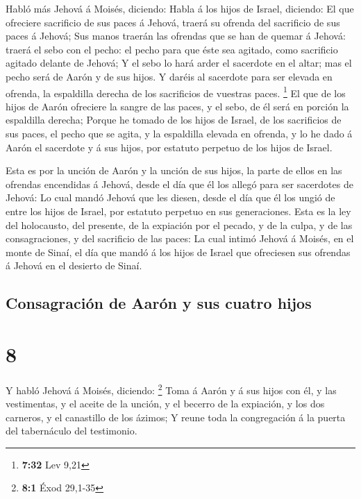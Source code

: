  Habló más Jehová á Moisés, diciendo: 
Habla á los hijos de Israel, diciendo: El que ofreciere sacrificio de
sus paces á Jehová, traerá su ofrenda del sacrificio de sus paces á
Jehová;  Sus manos traerán las ofrendas que se han de
quemar á Jehová: traerá el sebo con el pecho: el pecho para que éste sea
agitado, como sacrificio agitado delante de Jehová;  Y el
sebo lo hará arder el sacerdote en el altar; mas el pecho será de Aarón
y de sus hijos.  Y daréis al sacerdote para ser elevada
en ofrenda, la espaldilla derecha de los sacrificios de vuestras paces.
\footnote{\textbf{7:32} Lev 9,21}  El que de los hijos de
Aarón ofreciere la sangre de las paces, y el sebo, de él será en porción
la espaldilla derecha;  Porque he tomado de los hijos de
Israel, de los sacrificios de sus paces, el pecho que se agita, y la
espaldilla elevada en ofrenda, y lo he dado á Aarón el sacerdote y á sus
hijos, por estatuto perpetuo de los hijos de Israel.

 Esta es por la unción de Aarón y la unción de sus hijos,
la parte de ellos en las ofrendas encendidas á Jehová, desde el día que
él los allegó para ser sacerdotes de Jehová:  Lo cual
mandó Jehová que les diesen, desde el día que él los ungió de entre los
hijos de Israel, por estatuto perpetuo en sus generaciones.
 Esta es la ley del holocausto, del presente, de la
expiación por el pecado, y de la culpa, y de las consagraciones, y del
sacrificio de las paces:  La cual intimó Jehová á Moisés,
en el monte de Sinaí, el día que mandó á los hijos de Israel que
ofreciesen sus ofrendas á Jehová en el desierto de Sinaí.

\hypertarget{consagraciuxf3n-de-aaruxf3n-y-sus-cuatro-hijos}{%
\subsection{Consagración de Aarón y sus cuatro
hijos}\label{consagraciuxf3n-de-aaruxf3n-y-sus-cuatro-hijos}}

\hypertarget{section-7}{%
\section{8}\label{section-7}}

 Y habló Jehová á Moisés, diciendo: \footnote{\textbf{8:1}
  Éxod 29,1-35}  Toma á Aarón y á sus hijos con él, y las
vestimentas, y el aceite de la unción, y el becerro de la expiación, y
los dos carneros, y el canastillo de los ázimos;  Y reune
toda la congregación á la puerta del tabernáculo del testimonio.

